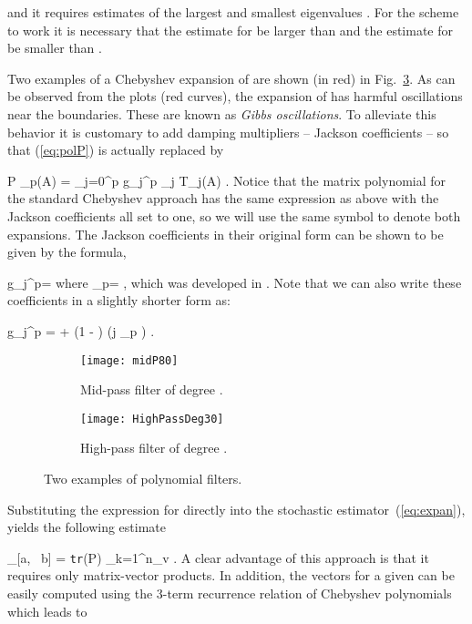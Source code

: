\documentclass[12pt]{article}		\usepackage{tabls,multirow}
\def\trace{\mbox{\tt tr}}
\newcommand{\ab}{[a, \ b]}
\def\nref#1{(\ref{#1})}
\newcommand{\eq}[1]{}
\begin{document}
and it 
requires estimates of the largest and smallest eigenvalues . For the scheme to work it is necessary that
the estimate for   be larger than 
 and 
the estimate for   be smaller than 
.

Two  examples of a Chebyshev expansion of  are shown (in red) in
Fig.~\ref{fig:midP}.  As can be observed from the plots (red curves),
the expansion of  has harmful oscillations near the
boundaries. These are known as \emph{Gibbs oscillations}. To alleviate
this behavior it is customary to add damping multipliers -- Jackson
coefficients -- so that \nref{eq:polP} is actually replaced by
\eq{eq:polPJ} 
P \approx \psi_p(A) = \sum_{j=0}^p g_j^{p} \gamma_j
T_j(A) .  
\en 
Notice that the matrix polynomial for the standard
Chebyshev approach has the same expression as above with
the Jackson coefficients  all set to one, so we will use
the same symbol to denote both expansions.
The Jackson coefficients in their original form can be shown 
to be given by the formula,
\eq{eq:JacCoef} 
g_{j}^{p}=
\quad \mbox{where}\quad
 \alpha_{p}=
 , 
\en 
which was developed in \cite{Jay-al}. Note that we can also write these
coefficients in a slightly shorter form as:
\eq{eq:JacCoef1}
g_{j}^{p} = 
 + 
 \left(1 -  \right) \cos(j \alpha_{p} ) .
\en
\begin{figure}[htb]
\centering
  \begin{subfigure}[b]{0.48\textwidth}
                \centering
                \texttt{[image: midP80]}
                \caption{Mid-pass filter of degree .}
                \label{fig:mid-pass}
  \end{subfigure}
  \begin{subfigure}[b]{0.48\textwidth}
                \centering
                \texttt{[image: HighPassDeg30]}
                \caption{High-pass filter of degree .}
                \label{fig:high-pass}
  \end{subfigure}
\caption{Two examples of polynomial filters.} 
\label{fig:midP}
\end{figure} 

Substituting  the expression for  directly into the
stochastic estimator~(\ref{eq:expan}), yields the following estimate
\eq{eq:estP}  
\mu_{\ab} = \trace (P) \approx {} \sum_{k=1}^{n_v} 
\left[
\sum_{j=0}^p \gamma_j v_k^T T_j(A) v_k \right]   
 . \en
A clear  advantage of this approach is that it requires only matrix-vector
products. In addition, the vectors  for a given  can be
easily computed using the 3-term recurrence relation of Chebyshev polynomials
 which leads to 
\end{document}
